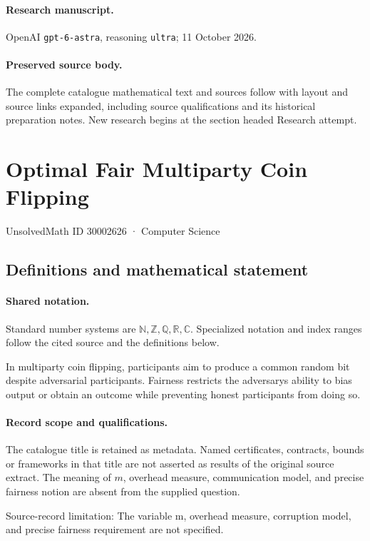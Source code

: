 \documentclass[11pt]{article}
\begin{document}
\paragraph{Research manuscript.} OpenAI \texttt{gpt-6-astra}, reasoning \texttt{ultra}; 11 October 2026.
\paragraph{Preserved source body.} The complete catalogue mathematical text and sources follow with layout and source links expanded, including source qualifications and its historical preparation notes. New research begins at the section headed Research attempt.

\section{Optimal Fair Multiparty Coin Flipping}\label{30002626}
{\small UnsolvedMath ID 30002626 · Computer Science}
\subsection{Definitions and mathematical statement}

\paragraph{Shared notation.}Standard number systems are $\mathbb N,\mathbb Z,\mathbb Q,\mathbb R,\mathbb C$. Specialized notation and index ranges follow the cited source and the definitions below.


In multiparty coin flipping, participants aim to produce a common random bit despite adversarial participants. Fairness restricts the adversary\textquotesingle s ability to bias output or obtain an outcome while preventing honest participants from doing so.
\paragraph{Record scope and qualifications.}
The catalogue title is retained as metadata. Named certificates, contracts, bounds or frameworks in that title are not asserted as results of the original source extract.
The meaning of $m$, overhead measure, communication model, and precise fairness notion are absent from the supplied question.

Source-record limitation: The variable m, overhead measure, corruption model, and precise fairness requirement are not specified.
\end{document}
